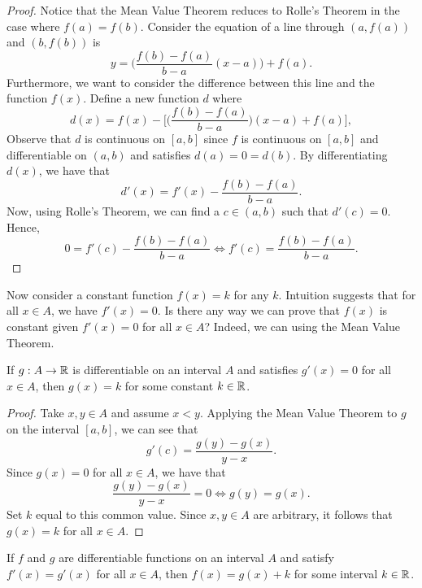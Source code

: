 \begin{proof}
    Notice that the Mean Value Theorem reduces to Rolle's Theorem in the case where \( f(a) = f(b)  \).
Consider the equation of a line through \( (a, f(a) ) \) and \( (b , f(b) ) \) is 
\[  y = \Big( \frac{ f(b) - f(a)  }{ b - a  } (x -a ) \Big) + f(a). \]
Furthermore, we want to consider the difference between this line and the function \( f(x)  \). Define a new function \( d   \) where 
\[  d(x) = f(x) - \Big[ \Big( \frac{ f(b) - f(a)  }{ b - a  }  \Big) (x - a ) + f(a)     \Big], \]
Observe that \( d  \) is continuous on \( [a,b]  \) since \( f  \) is continuous on \( [a,b]  \) and differentiable on \( (a,b)  \) and satisfies \( d(a) = 0 = d(b)  \). By differentiating \( d(x)  \), we have that 
\[  d'(x) = f'(x) - \frac{ f(b) - f(a)  }{ b - a  }. \]
Now, using Rolle's Theorem, we can find a \( c \in (a,b)  \) such that \( d'(c) = 0   \). Hence, 
\[  0 = f'(c) - \frac{ f(b) - f(a)  }{ b -a  } \iff f'(c) = \frac{ f(b) - f(a)  }{ b - a  }.  \] 

\end{proof}

Now consider a constant function \( f(x) = k  \) for any \( k  \). Intuition suggests that for all \( x \in A  \), we have \( f'(x) = 0  \). Is there any way we can prove that \( f(x)  \) is constant given \( f'(x) = 0  \) for all \( x \in A  \)? Indeed, we can using the Mean Value Theorem.

\begin{corollary}
If \( g: A \to \mathbb{R}  \) is differentiable on an interval \( A  \) and satisfies \( g'(x) = 0  \) for all \( x \in A  \), then \( g(x) = k  \) for some constant \(  k \in \mathbb{R}  \).
\end{corollary}

\begin{proof}
    Take \( x, y \in A  \) and assume \( x < y  \). Applying the Mean Value Theorem to \( g  \) on the interval \( [a,b ] \), we can see that 
    \[  g'(c) = \frac{ g(y) - g(x)   }{ y- x  }.  \]
    Since \( g(x) = 0  \) for all \( x \in A  \), we have that 
    \[  \frac{ g(y) - g(x)  }{ y -x  } = 0  \iff g(y) = g(x). \]
    Set \(  k  \) equal to this common value. Since \( x,y \in A  \) are arbitrary, it follows that \( g(x) = k \) for all \( x \in A  \).
\end{proof}

\begin{corollary}
If \( f  \) and \( g  \) are differentiable functions on an interval \( A  \) and satisfy \( f'(x) = g'(x)   \) for all \( x \in A  \), then \( f(x) = g(x) + k  \) for some interval \(  k \in \mathbb{R}  \).
\end{corollary}

